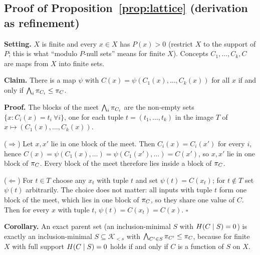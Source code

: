 \subsection{Proof of Proposition~\ref{prop:lattice} (derivation as refinement)}
\label{proof:P1}
\textbf{Setting.} $X$ is finite and every $x\in X$ has $P(x)>0$ (restrict $X$
to the support of $P$; this is what ``modulo $P$-null sets'' means for
finite $X$). Concepts $C_1,\dots,C_k,C$ are maps from $X$ into finite sets.

\textbf{Claim.} There is a map $\psi$ with $C(x)=\psi(C_1(x),\dots,C_k(x))$
for all $x$ if and only if $\bigwedge_i\pi_{C_i}\le\pi_C$.

\textbf{Proof.} The blocks of the meet $\bigwedge_i\pi_{C_i}$ are the
non-empty sets $\{x:C_i(x)=t_i\ \forall i\}$, one for each tuple
$t=(t_1,\dots,t_k)$ in the image $T$ of $x\mapsto(C_1(x),\dots,C_k(x))$.

($\Rightarrow$) Let $x,x'$ lie in one block of the meet. Then
$C_i(x)=C_i(x')$ for every $i$, hence
$C(x)=\psi(C_1(x),\dots)=\psi(C_1(x'),\dots)=C(x')$, so $x,x'$ lie in one block
of $\pi_C$. Every block of the meet therefore lies inside a block of
$\pi_C$.

($\Leftarrow$) For $t\in T$ choose any $x_t$ with tuple $t$ and set
$\psi(t)=C(x_t)$; for $t\notin T$ set $\psi(t)$ arbitrarily. The choice does
not matter: all inputs with tuple $t$ form one block of the meet, which lies
in one block of $\pi_C$, so they share one value of $C$. Then for every $x$
with tuple $t$, $\psi(t)=C(x_t)=C(x)$. \hfill$\square$

\textbf{Corollary.} An exact parent set (an inclusion-minimal $S$ with
$H(C\mid S)=0$) is exactly an inclusion-minimal $S\subseteq\mathcal{K}_{<s}$
with $\bigwedge_{C'\in S}\pi_{C'}\le\pi_C$, because for finite $X$ with
full support $H(C\mid S)=0$ holds if and only if $C$ is a function of $S$
on $X$.
